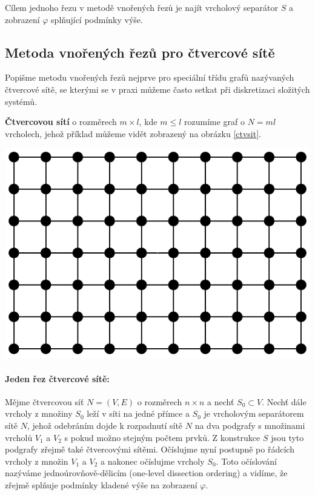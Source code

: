 \documentclass{ctuthesis}
\theoremstyle{plain}
\theoremstyle{definition}
\begin{document}
Cílem jednoho řezu v metodě vnořených řezů je najít vrcholový separátor $S$ a zobrazení $\varphi$ splňující podmínky výše.

\subsection{Metoda vnořených řezů pro čtvercové sítě}

Popišme metodu vnořených řezů nejprve pro speciální třídu grafů nazývaných čtvercové sítě, se kterými se v praxi můžeme často setkat při diskretizaci složitých systémů.

\textbf{Čtvercovou sítí} o rozměrech $m \times l$, kde $m \leq l$ rozumíme graf o $N = ml$  vrcholech, jehož příklad můžeme vidět zobrazený na obrázku \ref{ctvsit}.

\medskip
{
  \centering
  \includegraphics[scale=0.6]{pictures/ctvercovasit.pdf}
}

\paragraph{Jeden řez čtvercové sítě:}

Mějme čtvercovou síť $N = (V,E)$ o rozměrech $n \times n$ a nechť $S_0 \subset V$. Nechť dále vrcholy z množiny $S_0$ leží v síti na jedné přímce a $S_0$ je vrcholovým separátorem sítě $N$, jehož odebráním dojde k rozpadnutí sítě $N$ na dva podgrafy s množinami vrcholů $V_1$ a $V_2$ s pokud možno stejným počtem prvků. Z konstrukce $S$ jsou tyto podgrafy zřejmě také čtvercovými sítěmi. Očíslujme nyní postupně po řádcích vrcholy z množin $V_1$ a $V_2$ a nakonec očíslujme vrcholy $S_0$. Toto očíslování nazýváme jednoúrovňově-dělicím (one-level dissection ordering) a vidíme, že zřejmě splňuje podmínky kladené výše na zobrazení $\varphi$.
\end{document}
